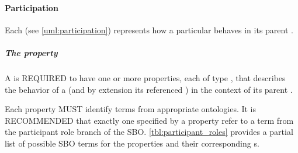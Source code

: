 \paragraph{Participation}
\label{sec:Participation}

Each  (see \ref{uml:participation}) represents how a particular  behaves in its parent .


\subparagraph{The  property}\label{sec:role:P}

A  is REQUIRED to have one or more  properties, each of type , that describes the behavior of a  (and by extension its referenced ) in the context of its parent .

Each  property MUST identify terms from appropriate ontologies. It is RECOMMENDED that exactly one  specified by a  property refer to a term from the participant role branch of the SBO. \ref{tbl:participant_roles} provides a partial list of possible SBO terms for the  properties and their corresponding s.

